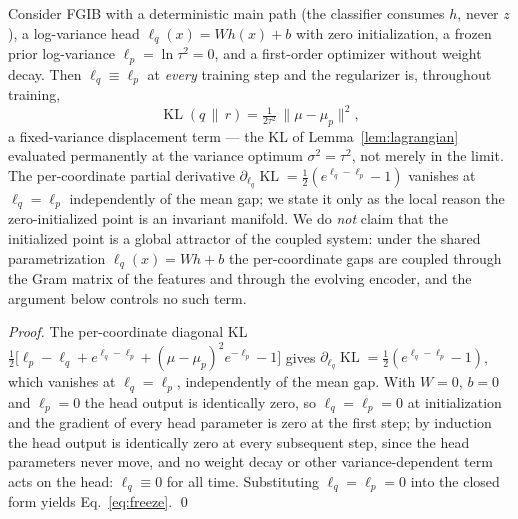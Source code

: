 \begin{proposition}\label{prop:varfreeze}
Consider FGIB with a deterministic main path (the classifier consumes $h$, never $z$),
a log-variance head $\ell_q(x) = W h(x) + b$ with zero initialization, a frozen prior
log-variance $\ell_p = \ln \tau^2 = 0$, and a first-order optimizer without weight
decay. Then $\ell_q \equiv \ell_p$ at \emph{every} training step and the regularizer is,
throughout training,
\begin{equation}
\operatorname{KL}(q\,\|\,r)
= \tfrac{1}{2\tau^2}\,\|\mu - \mu_p\|^2,
\label{eq:freeze}
\end{equation}
a fixed-variance displacement term --- the KL of Lemma~\ref{lem:lagrangian} evaluated
permanently at the variance optimum $\sigma^2 = \tau^2$, not merely in the limit.
The per-coordinate partial derivative
$\partial_{\ell_q}\operatorname{KL} = \tfrac12(e^{\ell_q-\ell_p}-1)$ vanishes at
$\ell_q = \ell_p$ independently of the mean gap; we state it only as the local reason
the zero-initialized point is an invariant manifold. We do \emph{not} claim that the
initialized point is a global attractor of the coupled system: under the shared
parametrization $\ell_q(x) = Wh + b$ the per-coordinate gaps are coupled through the
Gram matrix of the features and through the evolving encoder, and the argument below
controls no such term.
\end{proposition}

\begin{proof}
The per-coordinate diagonal KL
$\tfrac12\big[\ell_p - \ell_q + e^{\ell_q-\ell_p} + (\mu-\mu_p)^2 e^{-\ell_p} - 1\big]$
gives
$\partial_{\ell_q}\operatorname{KL} = \tfrac12(e^{\ell_q-\ell_p}-1)$,
which vanishes at $\ell_q = \ell_p$, independently of the mean gap. With $W=0$, $b=0$
and $\ell_p=0$ the head output is identically zero, so $\ell_q = \ell_p = 0$ at
initialization and the gradient of every head parameter is zero at the first step;
by induction the head output is identically zero at every subsequent step, since the
head parameters never move, and no weight decay or other variance-dependent term acts
on the head: $\ell_q \equiv 0$ for all time.
Substituting $\ell_q=\ell_p=0$ into the closed form yields
Eq.~\eqref{eq:freeze}.
\hfill\qed
\end{proof}

